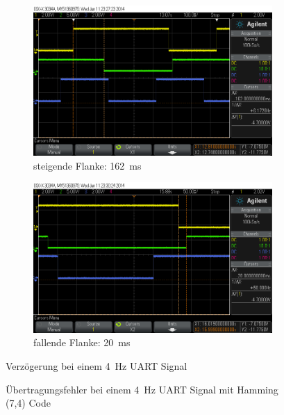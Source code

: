 \documentclass[12pt,a4paper]{article}
\begin{document}
\begin{figure}[H]
  \centering
  \begin{subfigure}[b]{0.6\textwidth}
    \includegraphics[width=\textwidth]{../measurements/20140611/4Hz_rising_edge/scope_2.png}
    \caption{steigende Flanke: \SI{162}{\milli\second}}
    \label{fig:uart_4hz_rising_edge}
  \end{subfigure}
  \begin{subfigure}[b]{0.6\textwidth}
    \includegraphics[width=\textwidth]{../measurements/20140611/4Hz_falling_edge/scope_6.png}
    \caption{fallende Flanke: \SI{20}{\milli\second}}
    \label{fig:uart_4hz_falling_edge}
  \end{subfigure}
  \caption{Verzögerung bei einem \SI{4}{\hertz} UART Signal}
\end{figure}

\begin{figure}[H]
  \centering
  \caption{Übertragungsfehler bei einem \SI{4}{\hertz} UART Signal mit Hamming (7,4) Code}
  \label{fig:sotware_uart_errors}
\end{figure}
\end{document}
